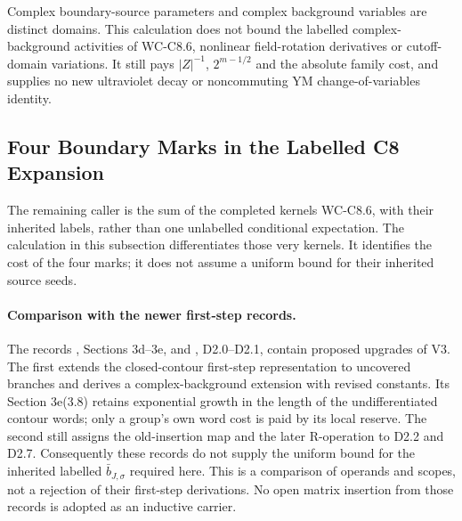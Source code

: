 \documentclass[11pt]{article}
\begin{document}
Complex boundary-source parameters and complex background variables
are distinct domains. This calculation does not bound the labelled
complex-background activities of WC-C8.6, nonlinear field-rotation
derivatives or cutoff-domain variations. It still pays $|Z|^{-1}$,
$2^{m-1/2}$ and the absolute family cost, and supplies no new ultraviolet
decay or noncommuting YM change-of-variables identity.

\subsection{Four Boundary Marks in the Labelled C8 Expansion}
\label{sec:c8-fourth-labelled}

The remaining caller is the sum of the completed kernels WC-C8.6,
with their inherited labels, rather than one unlabelled conditional
expectation. The calculation in this subsection differentiates those
very kernels. It identifies the cost of the four marks; it does not
assume a uniform bound for their inherited source seeds.

\paragraph{Comparison with the newer first-step records.}
The records ,
Sections 3d--3e, and
,
D2.0--D2.1, contain proposed upgrades of V3. The first extends the
closed-contour first-step representation to uncovered branches and
derives a complex-background extension with revised constants. Its
Section 3e(3.8) retains exponential growth in the length of the
undifferentiated contour words; only a group's own word cost is paid
by its local reserve. The second still assigns the old-insertion map
and the later R-operation to D2.2 and D2.7. Consequently these records
do not supply the uniform bound for the inherited labelled
$\bar b_{J,\sigma}$ required here. This is a comparison of operands
and scopes, not a rejection of their first-step derivations. No open
matrix insertion from those records is adopted as an inductive carrier.
\end{document}
